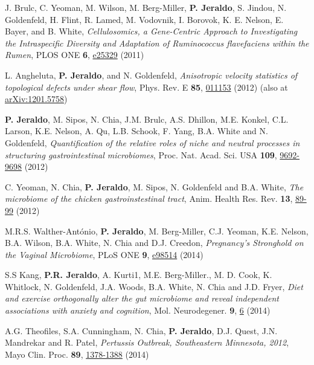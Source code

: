 \documentclass[letterpaper]{article}
\renewenvironment{itemize}{
  \begin{list}{}{
    \setlength{\leftmargin}{1.5em}
  }
}{
  \end{list}
}
\begin{document}
\begin{itemize}
\item J. Brulc, C. Yeoman, M. Wilson, M. Berg-Miller, \textbf{P. Jeraldo},
S. Jindou, N. Goldenfeld, H. Flint, R. Lamed, M. Vodovnik, I. Borovok, K. E. Nelson,
E. Bayer, and B. White, \textit{Cellulosomics, a Gene-Centric Approach to
Investigating the Intraspecific Diversity and Adaptation of Ruminococcus
flavefaciens within the Rumen}, PLOS ONE \textbf{6},
\href{http://www.plosone.org/article/info:doi/10.1371/journal.pone.0025329}{
e25329} (2011)
\item L. Angheluta, \textbf{P. Jeraldo}, and N. Goldenfeld, \textit{Anisotropic
velocity statistics of topological defects under shear flow}, Phys. Rev. E
\textbf{85}, \href{http://link.aps.org/doi/10.1103/PhysRevE.85.011153}{011153}
(2012) (also at \href{http://arxiv.org/abs/1201.5758}{arXiv:1201.5758})
\item \textbf{P. Jeraldo}, M. Sipos, N. Chia, J.M. Brulc, A.S. Dhillon, M.E. Konkel, C.L. Larson, 
K.E. Nelson, A. Qu, L.B. Schook, F. Yang, B.A. White and N. Goldenfeld, 
\textit{Quantification of the relative roles of niche and neutral processes in structuring gastrointestinal microbiomes}, 
Proc. Nat. Acad. Sci. USA \textbf{109}, \href{http://dx.doi.org/10.1073/pnas.1206721109}{9692-9698} (2012)
\item C. Yeoman, N. Chia, \textbf{P. Jeraldo}, M. Sipos, N. Goldenfeld and B.A. White, 
\textit{The microbiome of the chicken gastroinstestinal tract}, 
Anim. Health Res. Rev. \textbf{13}, \href{http://dx.doi.org/10.1017/S1466252312000138}{89-99} (2012)
\item M.R.S. Walther-António, \textbf{P. Jeraldo}, M. Berg-Miller, C.J. Yeoman, K.E. Nelson, B.A. Wilson, B.A. White, N. Chia and D.J. Creedon, \textit{Pregnancy's Stronghold on the Vaginal Microbiome}, PLoS ONE \textbf{9}, \href{http://dx.plos.org/10.1371/journal.pone.0098514.g008}{e98514} (2014)
\item S.S Kang, \textbf{P.R. Jeraldo}, A. Kurti1, M.E. Berg-Miller., M. D. Cook, K. Whitlock, N. Goldenfeld, J.A. Woods, B.A. White, N. Chia and J.D. Fryer, \textit{Diet and exercise orthogonally alter the gut microbiome and reveal independent associations with anxiety and cognition}, Mol. Neurodegener. \textbf{9},  \href{http://dx.doi.org/10.1186/1750-1326-9-36}{6} (2014)
\item A.G. Theofiles, S.A. Cunningham, N. Chia, \textbf{P. Jeraldo}, D.J. Quest, J.N. Mandrekar and R. Patel, \textit{Pertussis Outbreak, Southeastern Minnesota, 2012}, Mayo Clin. Proc. \textbf{89}, \href{http://dx.doi.org/10.1016/j.mayocp.2014.08.004}{1378-1388} (2014)

\end{itemize}
\end{document}
